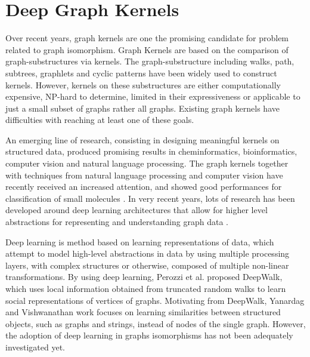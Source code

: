 \chapter{Deep Graph Kernels} %

\label{Chapter5} %


Over recent years, graph kernels are one the promising candidate for problem related to graph isomorphism. Graph Kernels are based on the comparison of graph-substructures via kernels. The graph-substructure including walks, path, subtrees, graphlets and cyclic patterns have been widely used to construct kernels. However, kernels on these substructures are either computationally expensive, NP-hard to determine, limited in their expressiveness or applicable to  just a small
subset of graphs rather all graphs. Existing graph kernels have difficulties with reaching at least one of these goals.

An emerging line of research, consisting in designing meaningful kernels on structured data, produced promising results in cheminformatics, bioinformatics, computer vision and natural language processing. The graph kernels together with techniques from natural language processing and computer vision  have recently received an increased attention, and showed good performances for classification of small molecules \citep{Mahe2004}. In very recent years, lots of research has been developed around deep learning architectures that allow for higher level abstractions for representing and understanding graph data \citep{Perozzi2014}.

Deep learning is method based on learning representations of data, which attempt to model high-level abstractions in data by using multiple processing layers, with complex structures or otherwise, composed of multiple non-linear transformations. By using deep learning, Perozzi et al.\citep{Perozzi2014} proposed DeepWalk, which uses local information obtained from truncated random walks to learn social representations of vertices of graphs. Motivating from DeepWalk, Yanardag and Vishwanathan \citep{Yanardag2015} work focuses on learning similarities
between structured objects, such as graphs and strings, instead of nodes of the single graph. However, the adoption of deep learning in graphs isomorphisms has not been adequately investigated yet. 

